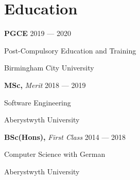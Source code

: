 \section{Education}
\parbox[t][][t]{\linewidth}{
	\parbox{\linewidth}{\textbf{PGCE }\textit{} \hfill {{2019 --- 2020}}}
	\parbox{\linewidth}{Post-Compulsory Education and Training}
	\parbox{\linewidth}{{Birmingham City University}}
	\smallskip
}

\parbox[t][][t]{\linewidth}{
	\parbox{\linewidth}{\textbf{MSc, }\textit{Merit} \hfill {{2018 --- 2019}}}
	\parbox{\linewidth}{{Software Engineering}}
	\parbox{\linewidth}{{Aberystwyth University}}
	\smallskip
}

\parbox[t][][t]{\linewidth}{
	\parbox{\linewidth}{\textbf{BSc(Hons), }\textit{First Class} \hfill {{2014 --- 2018}}}
	\parbox{\linewidth}{{Computer Science with German}}
	\parbox{\linewidth}{{Aberystwyth University}}
}